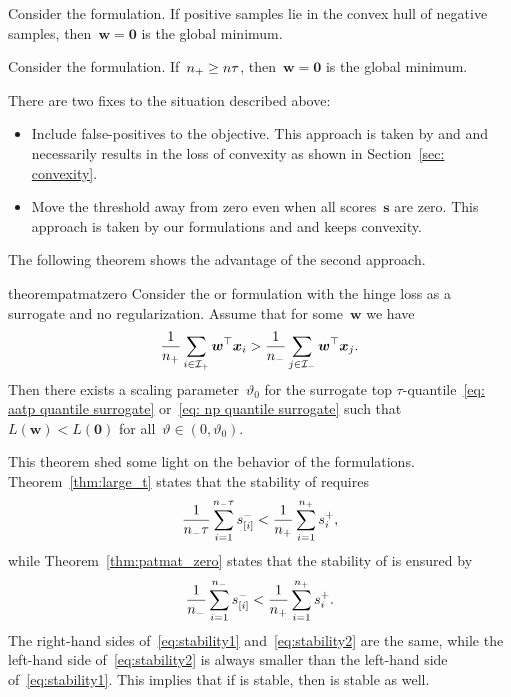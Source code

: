 \begin{corollary}\label{cor:toppush}
  Consider the \TopPush formulation. If positive samples lie in the convex hull of negative samples, then~$\bm{w}=\bm{0}$ is the global minimum.
\end{corollary}

\begin{corollary}\label{cor:topmean}
  Consider the \TopMeanK formulation. If~$n_{+}\geq n\tau$, then~$\bm{w}=\bm{0}$ is the global minimum.
\end{corollary}

There are two fixes to the situation described above:
\begin{itemize}
  \item Include false-positives to the objective. This approach is taken by \Grill and \GrillNP and necessarily results in the loss of convexity as shown in Section~\ref{sec: convexity}.
  \item Move the threshold away from zero even when all scores~$\bm{s}$ are zero. This approach is taken by our formulations \PatMat and \PatMatNP and keeps convexity.
\end{itemize}
The following theorem shows the advantage of the second approach.

\begin{restatable}{theorem}{patmatzero}\label{thm:patmat_zero}
  Consider the \PatMat or \PatMatNP formulation with the hinge loss as a surrogate and no regularization. Assume that for some~$\bm{w}$ we have
  \begin{equation}\label{eq:patmat_zero}
    \frac{1}{n_{+}}\sum_{i \in \mathcal{I}_{+}}\bm{w}^{\top} \bm{x}_i > \frac{1}{n_{-}}\sum_{j \in \mathcal{I}_{-}}\bm{w}^{\top} \bm{x}_j.
  \end{equation}
  Then there exists a scaling parameter~$\vartheta_0$ for the surrogate top $\tau$-quantile~\eqref{eq: aatp quantile surrogate} or~\eqref{eq: np quantile surrogate} such that~$L(\bm{w}) < L(\bm{0})$ for all~$\vartheta \in (0, \vartheta_0)$.
\end{restatable}

This theorem shed some light on the behavior of the formulations. Theorem~\ref{thm:large_t} states that the stability of \tauFPL requires
\begin{equation}\label{eq:stability1}
  \frac{1}{n_{-}\tau}\sum_{i=1}^{n_{-}\tau}s_{[i]}^- < \frac{1}{n_{+}}\sum_{i=1}^{n_{+}} s_{i}^+,
\end{equation}
while Theorem~\ref{thm:patmat_zero} states that the stability of \PatMatNP is ensured by
\begin{equation}\label{eq:stability2}
  \frac{1}{n_{-}}\sum_{i=1}^{n_{-}}s_{[i]}^- < \frac{1}{n_{+}}\sum_{i=1}^{n_{+}} s_{i}^+.
\end{equation}
The right-hand sides of~\eqref{eq:stability1} and~\eqref{eq:stability2} are the same, while the left-hand side of~\eqref{eq:stability2} is always smaller than the left-hand side of~\eqref{eq:stability1}. This implies that if \tauFPL is stable, then \PatMatNP is stable as well.

